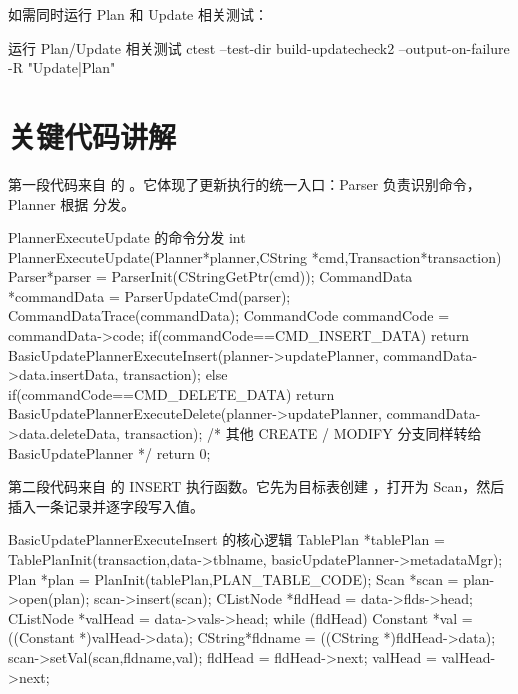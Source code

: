 如需同时运行 Plan 和 Update 相关测试：

\begin{dbcode}[listing options={language=bash}]{运行 Plan/Update 相关测试}
ctest --test-dir build-updatecheck2 --output-on-failure -R "Update|Plan"
\end{dbcode}

\section{关键代码讲解}
\label{sec:update-code}

第一段代码来自  的 。它体现了更新执行的统一入口：Parser 负责识别命令，Planner 根据  分发。

\begin{dbcode}{PlannerExecuteUpdate 的命令分发}
int PlannerExecuteUpdate(Planner*planner,CString *cmd,Transaction*transaction){
    Parser*parser = ParserInit(CStringGetPtr(cmd));
    CommandData *commandData = ParserUpdateCmd(parser);
    CommandDataTrace(commandData);
    CommandCode commandCode = commandData->code;
    if(commandCode==CMD_INSERT_DATA){
        return BasicUpdatePlannerExecuteInsert(planner->updatePlanner,
                                               commandData->data.insertData,
                                               transaction);
    }else if(commandCode==CMD_DELETE_DATA){
        return BasicUpdatePlannerExecuteDelete(planner->updatePlanner,
                                               commandData->data.deleteData,
                                               transaction);
    }
    /* 其他 CREATE / MODIFY 分支同样转给 BasicUpdatePlanner */
    return 0;
}
\end{dbcode}

第二段代码来自  的 INSERT 执行函数。它先为目标表创建 ，打开为 Scan，然后插入一条记录并逐字段写入值。

\begin{dbcode}{BasicUpdatePlannerExecuteInsert 的核心逻辑}
TablePlan *tablePlan = TablePlanInit(transaction,data->tblname,
                                     basicUpdatePlanner->metadataMgr);
Plan *plan = PlanInit(tablePlan,PLAN_TABLE_CODE);
Scan *scan = plan->open(plan);
scan->insert(scan);
CListNode *fldHead = data->flds->head;
CListNode *valHead = data->vals->head;
while (fldHead){
    Constant *val = ((Constant *)valHead->data);
    CString*fldname = ((CString *)fldHead->data);
    scan->setVal(scan,fldname,val);
    fldHead = fldHead->next;
    valHead = valHead->next;
}
\end{dbcode}

